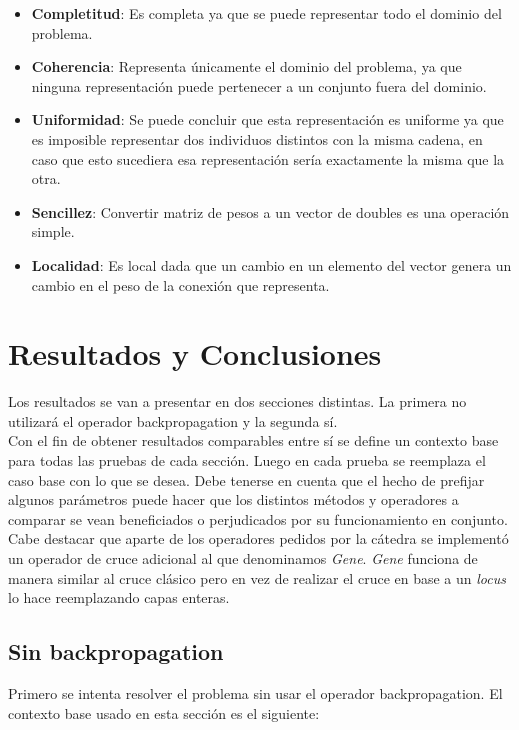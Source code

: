 \documentclass{sig-alternate}
\begin{document}
	\begin{itemize}

		\item \textbf{Completitud}: Es completa ya que se puede representar todo el dominio del problema.

		\item \textbf{Coherencia}: Representa únicamente el dominio del problema, ya que ninguna representación puede pertenecer a un conjunto fuera del dominio.

		\item \textbf{Uniformidad}: Se puede concluir que esta representación es uniforme ya que es imposible representar dos individuos distintos con la misma cadena, en caso que esto sucediera esa representación sería exactamente la misma que la otra.	

		\item \textbf{Sencillez}: Convertir matriz de pesos a un vector de doubles es una operación simple.

		\item \textbf{Localidad}: Es local dada que un cambio en un elemento
		del vector genera un cambio en el peso de la conexión que representa.

	\end{itemize}
	
\section{Resultados y Conclusiones}
	Los resultados se van a presentar en dos secciones distintas.
	La primera no utilizará el operador backpropagation y la segunda sí. \\

	Con el fin de obtener resultados comparables entre sí se define un
	contexto base para todas las pruebas de cada sección.
	Luego en cada prueba se reemplaza el caso base con lo que se desea.
	Debe tenerse en cuenta que el hecho de prefijar algunos parámetros puede
	hacer que los distintos métodos y operadores a comparar se vean
	beneficiados o perjudicados por su funcionamiento en conjunto. \\

	Cabe destacar que aparte de los operadores pedidos por la cátedra se
	implementó un operador de cruce adicional al que denominamos \textit{Gene}.
	\textit{Gene} funciona de manera similar al cruce clásico pero en vez de
	realizar el cruce en base a un \textit{locus} lo hace reemplazando
	capas enteras.


	\subsection{Sin backpropagation}
	Primero se intenta resolver el problema sin usar el operador backpropagation.
	El contexto base usado en esta sección es el siguiente:
\end{document}
